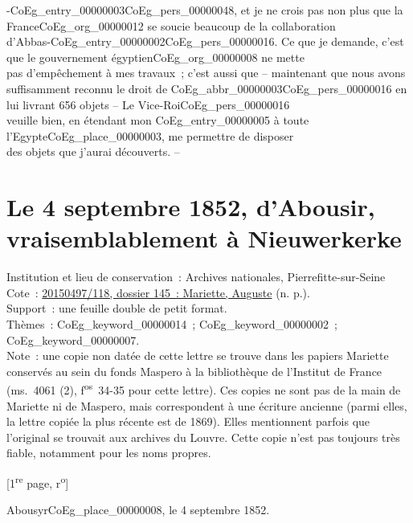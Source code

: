 \documentclass{book}
\begin{document}
{-\gls{CoEg_entry_00000003}\gls{CoEg_pers_00000048}, et je ne crois pas non plus que la France\gls{CoEg_org_00000012} se soucie beaucoup de la collaboration\\
d’Abbas-\Gls{CoEg_entry_00000002}\gls{CoEg_pers_00000016}. Ce que je demande, c’est que le gouvernement égyptien\gls{CoEg_org_00000008} ne mette\\
pas d’empêchement à mes travaux~; c’est aussi que – maintenant que nous avons\\
suffisamment reconnu le droit de \gls{CoEg_abbr_00000003}\gls{CoEg_pers_00000016} en lui livrant 656 objets – Le Vice-Roi\gls{CoEg_pers_00000016}\\
veuille bien, en étendant mon \gls{CoEg_entry_00000005} à toute l’Egypte\gls{CoEg_place_00000003}, me permettre de disposer\\
des objets que j’aurai découverts. –}
\hypertarget{CoEg_Mariette_1852-09-04}{}
\section*{Le 4 septembre 1852, d’Abousir, vraisemblablement à Nieuwerkerke}  
{\footnotesize \noindent Institution et lieu de conservation~: Archives nationales, Pierrefitte-sur-Seine\\
Cote~: \hyperlink{CoEg_Mariette_ms_001}{20150497/118, dossier 145~: Mariette, Auguste} (n. p.).\\
Support~: une feuille double de petit format.\\
Thèmes~: \gls{CoEg_keyword_00000014}~; \gls{CoEg_keyword_00000002}~; \gls{CoEg_keyword_00000007}.\\
Note~: une copie non datée de cette lettre se trouve dans les papiers Mariette conservés au sein du fonds Maspero à la bibliothèque de l’Institut de France (ms.~4061 (2), f\textsuperscript{os}~34-35 pour cette lettre). Ces copies ne sont pas de la main de Mariette ni de Maspero, mais correspondent à une écriture ancienne (parmi elles, la lettre copiée la plus récente est de 1869). Elles mentionnent parfois que l’original se trouvait aux archives du Louvre. Cette copie n’est pas toujours très fiable, notamment pour les noms propres.
\begin{center} {[1\textsuperscript{re} page, r\textsuperscript{o}]}\end{center}}
\begin{flushright}Abousyr\gls{CoEg_place_00000008}, le 4 septembre 1852.\end{flushright}
\end{document}
